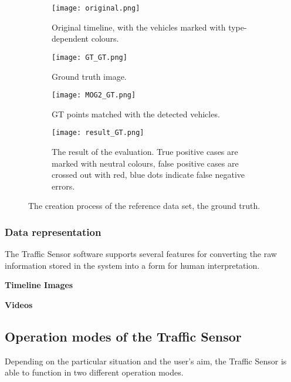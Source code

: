 \begin{figure}[!h]
	\centering
		\begin{subfigure}[!h]{0.9\textwidth}
		\texttt{[image: original.png]}
		\caption{Original timeline, with the vehicles marked with type-dependent colours.\label{fig:GT_original}}
	\end{subfigure}
	\hfill
	\begin{subfigure}[!h]{0.9\textwidth}
		\texttt{[image: GT\_GT.png]}
		\caption{Ground truth image.\label{fig:GT_GT}}
	\end{subfigure}
	\hfill
	\begin{subfigure}[!h]{0.9\textwidth}
		\texttt{[image: MOG2\_GT.png]}
		\caption{GT points matched with the detected vehicles. \label{fig:GT_MOG}}
	\end{subfigure}
	\hfill
	\begin{subfigure}[!h]{0.9\textwidth}
		\texttt{[image: result\_GT.png]}
		\caption{The result of the evaluation. True positive cases are marked with neutral colours, false positive cases are crossed out with red, blue dots indicate false negative errors.\label{fig:GT_result}}
	\end{subfigure}
	\caption{The creation process of the reference data set, the ground truth.\label{fig:GT}}
\end{figure}
\subsubsection{Data representation}
The Traffic Sensor software supports several features for converting the raw information stored in the system into a form for human interpretation.

\textbf{Timeline Images}

\textbf{Videos}
\subsection{Operation modes of the Traffic Sensor}
Depending on the particular situation and the user's aim, the Traffic Sensor is able to function in two different operation modes.
